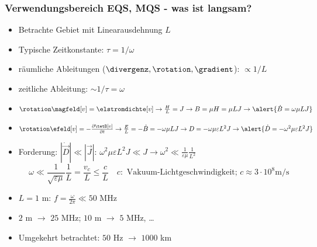 \begin{frame}
  \frametitle{Verwendungsbereich EQS, MQS - was ist langsam?}
  \begin{itemize}[<+->]
  \item Betrachte Gebiet mit \alert{Linearausdehnung} $L$
  \item Typische \alert{Zeitkonstante}: $\tau = 1/\omega$
  \item räumliche Ableitungen ($\divergenz, \rotation, \gradient$): $\propto 1/L$
  \item zeitliche Ableitung: $\sim 1 /\tau = \omega$
  \item $\rotation \magfeld[v]  = \elstromdichte[v] \to \frac{H}{L} = J \to B  = \mu H = \mu L J \to \alert{\dot{B}  =  \omega \mu L J}$
  \item $\rotation \efeld[v]  = -\frac{\partial \tetB[v]}{\partial t} \to \frac{E}{L} = - \dot{B} = - \omega \mu L J \to D = - \omega \mu\varepsilon L^2 J \to \alert{\dot{D} = - \omega^2 \mu\varepsilon L^2 J}$
  \item Forderung: $|\dot{\vec{D}}| \ll |\vec{J}|$: $\omega^2 \mu\varepsilon L^2 J \ll J \to \omega^2 \ll \frac{1}{\varepsilon \mu} \frac{1}{L^2}$
    $$
    \boxed{\omega \ll \frac{1}{\sqrt{\varepsilon \mu}} \frac{1}{L}} = \frac{v_c}{L} \le \frac{c}{L} \quad c: \text{ Vakuum-Lichtgeschwindigkeit; } c\approx 3\cdot 10^8 \text{m/s}
    $$
  \item $L=1$ m: $f=\frac{\omega}{2\pi} \ll 50$ MHz
  \item $2$ m $\to$ $25$ MHz; $10$ m $\to$ $5$ MHz, \dots
    \item Umgekehrt betrachtet: $50$ Hz $\to$ $1000$ km
  \end{itemize}
\end{frame}




   

